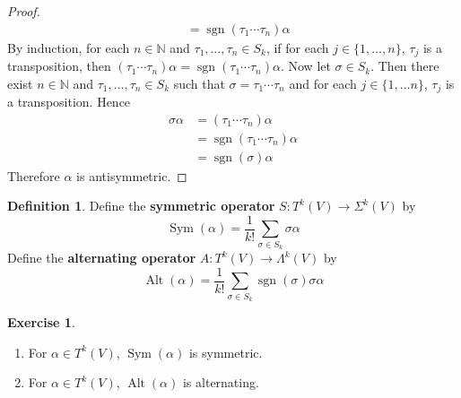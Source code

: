 \documentclass{book}
\theoremstyle{definition}
\newtheorem{defn}[definition]{Definition}
\newtheorem{ex}[definition]{Exercise}
\newcommand{\al}{\alpha}
\newcommand{\sig}{\sigma}
\newcommand{\Lam}{\Lambda}
\newcommand{\Sig}{\Sigma}
\newcommand{\N}{\mathbb{N}}
\DeclareMathOperator{\sgn}{sgn}
\DeclareMathOperator{\Sym}{Sym}
\DeclareMathOperator{\Alt}{Alt}
\DeclareMathOperator*{\0}{\mbf{0}}
\DeclareMathOperator*{\1}{\mbf{1}}
\begin{document}
\begin{proof}
\begin{align*}
			& = \sgn(\tau_1 \cdots \tau_n) \al 
		\end{align*}
		By induction, for each $n \in \N$ and $\tau_1, \ldots, \tau_n \in S_k$, if for each $j \in \{1, \ldots, n\}$, $\tau_j$ is a transposition, then $(\tau_1 \cdots \tau_n) \al  = \sgn(\tau_1 \cdots \tau_n) \al$. Now let $\sig \in S_k$. Then there exist $n \in \N$ and $\tau_1, \ldots, \tau_n \in S_k$ such that $\sig = \tau_1 \cdots \tau_n$ and for each $j \in \{1, \ldots n\}$, $\tau_j$ is a transposition. Hence
		\begin{align*}
			\sig \al 
			& = (\tau_1 \cdots \tau_n) \al \\
			& =  \sgn(\tau_1 \cdots \tau_n) \al \\
			& = \sgn(\sig) \al
		\end{align*}
		Therefore $\al$ is antisymmetric.
	\end{proof}
	
	\begin{defn}
		Define the \textbf{symmetric operator} $S: T^k(V) \rightarrow \Sig^k(V)$ by $$\Sym(\al) = \frac{1}{k!}\sum_{\sig \in S_k} \sig \al$$  Define the \textbf{alternating operator} $A: T^k(V) \rightarrow \Lam^k(V)$ by $$\Alt(\al) = \frac{1}{k!}\sum_{\sig \in S_k} \sgn(\sig)\sig \al$$
	\end{defn}
	
	\begin{ex}\
		\begin{enumerate}
			\item For $\al \in T^k(V)$, $\Sym(\al)$ is symmetric.
			\item For $\al \in T^k(V)$, $\Alt(\al)$ is alternating.
		\end{enumerate}
	\end{ex}
\end{document}
